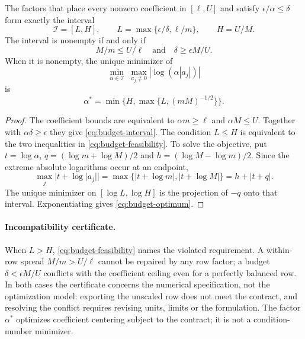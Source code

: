 \begin{proposition}
\label{prop:budget}
The factors that place every nonzero coefficient in $[\ell,U]$ and satisfy
$\epsilon/\alpha\le\delta$ form exactly the interval
\begin{equation}\label{eq:budget-interval}
 \mathcal I=[L,H],\qquad
 L=\max\{\epsilon/\delta,\ell/m\},\qquad H=U/M.
\end{equation}
The interval is nonempty if and only if
\begin{equation}\label{eq:budget-feasibility}
 M/m\le U/\ell\quad\text{and}\quad \delta\ge\epsilon M/U.
\end{equation}
When it is nonempty, the unique minimizer of
\begin{equation}\label{eq:budget-objective}
 \min_{\alpha\in\mathcal I}\;\max_{a_j\ne0}|\log(\alpha|a_j|)|
\end{equation}
is
\begin{equation}\label{eq:budget-optimum}
 \alpha^*=\min\{H,\max\{L,(mM)^{-1/2}\}\}.
\end{equation}
\end{proposition}

\begin{proof}
The coefficient bounds are equivalent to $\alpha m\ge\ell$ and $\alpha M\le U$.
Together with $\alpha\delta\ge\epsilon$ they give \eqref{eq:budget-interval}.
The condition $L\le H$ is equivalent to the two inequalities in
\eqref{eq:budget-feasibility}. To solve the objective, put $t=\log\alpha$,
$q=(\log m+\log M)/2$ and $h=(\log M-\log m)/2$. Since the extreme absolute
logarithms occur at an endpoint,
\[
 \max_j|t+\log|a_j||=\max\{|t+\log m|,|t+\log M|\}=h+|t+q|.
\]
The unique minimizer on $[\log L,\log H]$ is the projection of $-q$ onto that
interval. Exponentiating gives \eqref{eq:budget-optimum}.
\end{proof}

\paragraph{Incompatibility certificate.}
When $L>H$, \eqref{eq:budget-feasibility} names the violated requirement. A within-row
spread $M/m>U/\ell$ cannot be repaired by any row factor; a budget $\delta<\epsilon M/U$
conflicts with the coefficient ceiling even for a perfectly balanced row. In both cases the
certificate concerns the numerical specification, not the optimization model: exporting the
unscaled row does not meet the contract, and resolving the conflict requires revising units,
limits or the formulation. The factor $\alpha^*$ optimizes coefficient centering subject to
the contract; it is not a condition-number minimizer.

